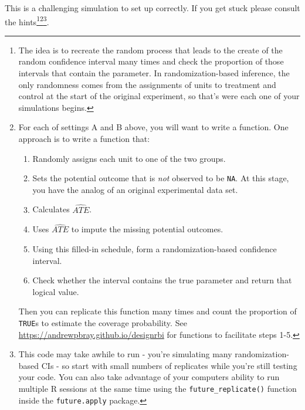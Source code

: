 \documentclass[
  letterpaper,
  DIV=11,
  numbers=noendperiod]{scrartcl}
\providecommand{\tightlist}{%
  \setlength{\itemsep}{0pt}\setlength{\parskip}{0pt}}
\begin{document}
\begin{enumerate}
  This is a challenging simulation to set up correctly. If you get stuck
  please consult the hints\footnote{The idea is to recreate the random
    process that leads to the create of the random confidence interval
    many times and check the proportion of those intervals that contain
    the parameter. In randomization-based inference, the only randomness
    comes from the assignments of units to treatment and control at the
    start of the original experiment, so that's were each one of your
    simulations begins.}\footnote{For each of settings A and B above,
    you will want to write a function. One approach is to write a
    function that:

    \begin{enumerate}
    \def\labelenumii{\arabic{enumii}.}
    \tightlist
    \item
      Randomly assigns each unit to one of the two groups.
    \item
      Sets the potential outcome that is \emph{not} observed to be
      \texttt{NA}. At this stage, you have the analog of an original
      experimental data set.
    \item
      Calculates \(\widehat{ATE}\).
    \item
      Uses \(\widehat{ATE}\) to impute the missing potential outcomes.
    \item
      Using this filled-in schedule, form a randomization-based
      confidence interval.
    \item
      Check whether the interval contains the true parameter and return
      that logical value.
    \end{enumerate}

    Then you can replicate this function many times and count the
    proportion of \texttt{TRUE}s to estimate the coverage probability.
    See \url{https://andrewpbray.github.io/designrbi} for functions to
    facilitate steps 1-5.}\footnote{This code may take awhile to run -
    you're simulating many randomization-based CIs - so start with small
    numbers of replicates while you're still testing your code. You can
    also take advantage of your computers ability to run multiple R
    sessions at the same time using the \texttt{future\_replicate()}
    function inside the \texttt{future.apply} package.}.
\end{enumerate}

\newpage{}
\end{document}
